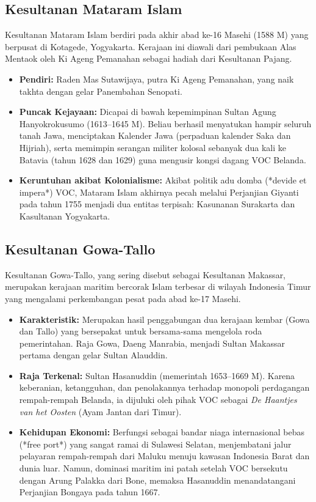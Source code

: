 \documentclass[12pt, a4paper]{article}
\begin{document}
\subsection{Kesultanan Mataram Islam}
Kesultanan Mataram Islam berdiri pada akhir abad ke-16 Masehi (1588 M) yang berpusat di Kotagede, Yogyakarta. Kerajaan ini diawali dari pembukaan Alas Mentaok oleh Ki Ageng Pemanahan sebagai hadiah dari Kesultanan Pajang.
\begin{itemize}
	\item \textbf{Pendiri:} Raden Mas Sutawijaya, putra Ki Ageng Pemanahan, yang naik takhta dengan gelar Panembahan Senopati.
	\item \textbf{Puncak Kejayaan:} Dicapai di bawah kepemimpinan Sultan Agung Hanyokrokusumo (1613--1645 M). Beliau berhasil menyatukan hampir seluruh tanah Jawa, menciptakan Kalender Jawa (perpaduan kalender Saka dan Hijriah), serta memimpin serangan militer kolosal sebanyak dua kali ke Batavia (tahun 1628 dan 1629) guna mengusir kongsi dagang VOC Belanda.
	\item \textbf{Keruntuhan akibat Kolonialisme:} Akibat politik adu domba (*devide et impera*) VOC, Mataram Islam akhirnya pecah melalui Perjanjian Giyanti pada tahun 1755 menjadi dua entitas terpisah: Kasunanan Surakarta dan Kasultanan Yogyakarta.
\end{itemize}

\subsection{Kesultanan Gowa-Tallo}
Kesultanan Gowa-Tallo, yang sering disebut sebagai Kesultanan Makassar, merupakan kerajaan maritim bercorak Islam terbesar di wilayah Indonesia Timur yang mengalami perkembangan pesat pada abad ke-17 Masehi.
\begin{itemize}
	\item \textbf{Karakteristik:} Merupakan hasil penggabungan dua kerajaan kembar (Gowa dan Tallo) yang bersepakat untuk bersama-sama mengelola roda pemerintahan. Raja Gowa, Daeng Manrabia, menjadi Sultan Makassar pertama dengan gelar Sultan Alauddin.
	\item \textbf{Raja Terkenal:} Sultan Hasanuddin (memerintah 1653--1669 M). Karena keberanian, ketangguhan, dan penolakannya terhadap monopoli perdagangan rempah-rempah Belanda, ia dijuluki oleh pihak VOC sebagai \textit{De Haantjes van het Oosten} (Ayam Jantan dari Timur).
	\item \textbf{Kehidupan Ekonomi:} Berfungsi sebagai bandar niaga internasional bebas (*free port*) yang sangat ramai di Sulawesi Selatan, menjembatani jalur pelayaran rempah-rempah dari Maluku menuju kawasan Indonesia Barat dan dunia luar. Namun, dominasi maritim ini patah setelah VOC bersekutu dengan Arung Palakka dari Bone, memaksa Hasanuddin menandatangani Perjanjian Bongaya pada tahun 1667.
\end{itemize}
\end{document}
